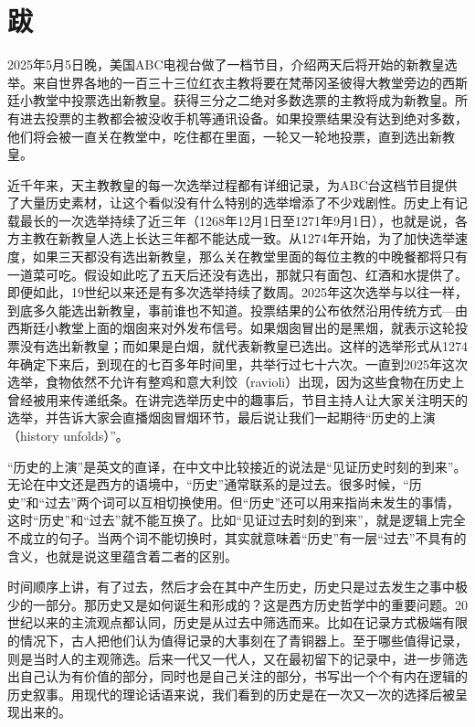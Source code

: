 \chapter*{跋}

2025年5月5日晚，美国ABC电视台做了一档节目，介绍两天后将开始的新教皇选举。来自世界各地的一百三十三位红衣主教将要在梵蒂冈圣彼得大教堂旁边的西斯廷小教堂中投票选出新教皇。获得三分之二绝对多数选票的主教将成为新教皇。所有进去投票的主教都会被没收手机等通讯设备。如果投票结果没有达到绝对多数，他们将会被一直关在教堂中，吃住都在里面，一轮又一轮地投票，直到选出新教皇。



近千年来，天主教教皇的每一次选举过程都有详细记录，为ABC台这档节目提供了大量历史素材，让这个看似没有什么特别的选举增添了不少戏剧性。历史上有记载最长的一次选举持续了近三年（1268年12月1日至1271年9月1日），也就是说，各方主教在新教皇人选上长达三年都不能达成一致。从1274年开始，为了加快选举速度，如果三天都没有选出新教皇，那么关在教堂里面的每位主教的中晚餐都将只有一道菜可吃。假设如此吃了五天后还没有选出，那就只有面包、红酒和水提供了。即便如此，19世纪以来还是有多次选举持续了数周。2025年这次选举与以往一样，到底多久能选出新教皇，事前谁也不知道。投票结果的公布依然沿用传统方式—由西斯廷小教堂上面的烟囱来对外发布信号。如果烟囱冒出的是黑烟，就表示这轮投票没有选出新教皇；而如果是白烟，就代表新教皇已选出。这样的选举形式从1274年确定下来后，到现在的七百多年时间里，共举行过七十六次。一直到2025年这次选举，食物依然不允许有整鸡和意大利饺（ravioli）出现，因为这些食物在历史上曾经被用来传递纸条。在讲完选举历史中的趣事后，节目主持人让大家关注明天的选举，并告诉大家会直播烟囱冒烟环节，最后说让我们一起期待“历史的上演（history unfolds）”。



“历史的上演”是英文的直译，在中文中比较接近的说法是“见证历史时刻的到来”。无论在中文还是西方的语境中，“历史”通常联系的是过去。很多时候，“历史”和“过去”两个词可以互相切换使用。但“历史”还可以用来指尚未发生的事情，这时“历史”和“过去”就不能互换了。比如“见证过去时刻的到来”，就是逻辑上完全不成立的句子。当两个词不能切换时，其实就意味着“历史”有一层“过去”不具有的含义，也就是说这里蕴含着二者的区别。



时间顺序上讲，有了过去，然后才会在其中产生历史，历史只是过去发生之事中极少的一部分。那历史又是如何诞生和形成的？这是西方历史哲学中的重要问题。20世纪以来的主流观点都认同，历史是从过去中筛选而来。比如在记录方式极端有限的情况下，古人把他们认为值得记录的大事刻在了青铜器上。至于哪些值得记录，则是当时人的主观筛选。后来一代又一代人，又在最初留下的记录中，进一步筛选出自己认为有价值的部分，同时也是自己关注的部分，书写出一个个有内在逻辑的历史叙事。用现代的理论话语来说，我们看到的历史是在一次又一次的选择后被呈现出来的。


